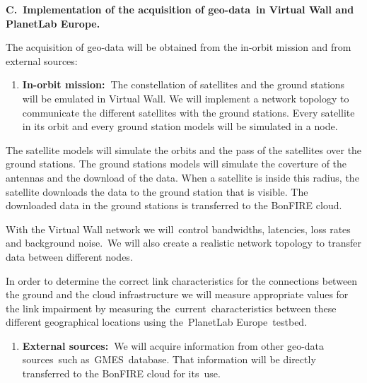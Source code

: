 \documentclass[a4paper]{article}
\newcounter{saveenum}
\newcommand\liststyleLFOxxxiv{%
\renewcommand\theenumi{\alph{enumi}}
\renewcommand\theenumii{\alph{enumii}}
\renewcommand\theenumiii{\roman{enumiii}}
\renewcommand\theenumiv{\arabic{enumiv}}
\renewcommand\labelenumi{\theenumi)}
\renewcommand\labelenumii{\theenumii.}
\renewcommand\labelenumiii{\theenumiii.}
\renewcommand\labelenumiv{\theenumiv.}
}
\begin{document}
\textbf{C.\ }\textbf{Implementation of the a}\textbf{cquisition of
geo-data}\textbf{\ in Virtual Wall and PlanetLab Europe.}\ 

The acquisition of geo-data will be obtained from the in-orbit mission
and from external sources:\ 

\liststyleLFOxxxiv
\setcounter{saveenum}{\value{enumi}}
\begin{enumerate}
\setcounter{enumi}{\value{saveenum}}
\item \textbf{In-orbit mission:\ }The constellation of satellites and
the ground stations will be emulated in Virtual Wall. We will implement
a network topology to communicate the different satellites with the
ground stations. Every satellite in its orbit and every ground station
models will be simulated in a node.\ 
\end{enumerate}

\bigskip

The satellite models will simulate the orbits and the pass of the
satellites over the ground stations. The ground stations models will
simulate the coverture of the antennas and the download of the data.
When a satellite is inside this radius, the satellite downloads the
data to the ground station that is visible. The downloaded data in the
ground stations is transferred to the BonFIRE cloud.\ 


\bigskip

With the Virtual Wall network we will\ control bandwidths, latencies,
loss rates and background noise.\ We will also create a realistic
network topology to transfer data between different nodes.\ 


\bigskip

In order to determine the correct link characteristics for the
connections between the ground and the cloud infrastructure we will
measure appropriate values for the link impairment by measuring
the\ current\ characteristics between these different geographical
locations using the\ PlanetLab Europe\ testbed.\ 


\bigskip

\liststyleLFOxxxiv
\setcounter{saveenum}{\value{enumi}}
\begin{enumerate}
\setcounter{enumi}{\value{saveenum}}
\item \textbf{External sources:\ }We will acquire information from other
geo-data sources\ such as\ GMES\ database. That information will be
directly transferred to the BonFIRE cloud for its\ use.\ 
\end{enumerate}
\end{document}
